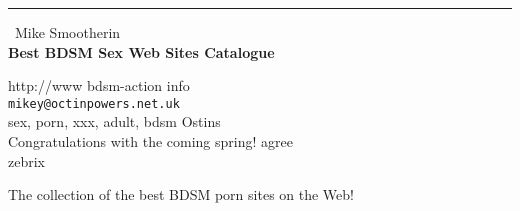 \documentclass{report}
\begin{document}
\begin{center}
\rule{6in}{1pt} \
{\large Mike Smootherin \\
{\bf Best BDSM Sex Web Sites Catalogue}}

http://www bdsm-action info
\\
{\tt mikey@octinpowers.net.uk}\\
sex, porn, xxx, adult, bdsm Ostins\\
Congratulations with the coming spring! agree\\
	zebrix\end{center}

The collection of the best BDSM porn sites on the Web!
\end{document}
